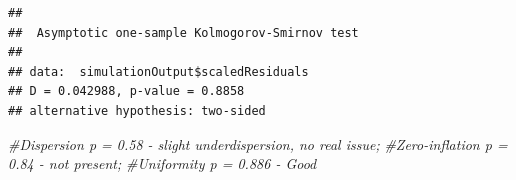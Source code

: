 \documentclass[
]{article}
\newenvironment{Shaded}{\begin{snugshade}}{\end{snugshade}}
\newcommand{\CommentTok}[1]{\textcolor[rgb]{0.56,0.35,0.01}{\textit{#1}}}
\begin{document}
\begin{verbatim}
## 
##  Asymptotic one-sample Kolmogorov-Smirnov test
## 
## data:  simulationOutput$scaledResiduals
## D = 0.042988, p-value = 0.8858
## alternative hypothesis: two-sided
\end{verbatim}

\begin{Shaded}
\begin{Highlighting}[]
\CommentTok{\#Dispersion p = 0.58 {-} slight underdispersion, no real issue; }
\CommentTok{\#Zero{-}inflation p = 0.84 {-} not present;}
\CommentTok{\#Uniformity p = 0.886 {-} Good}
\end{Highlighting}
\end{Shaded}
\end{document}
